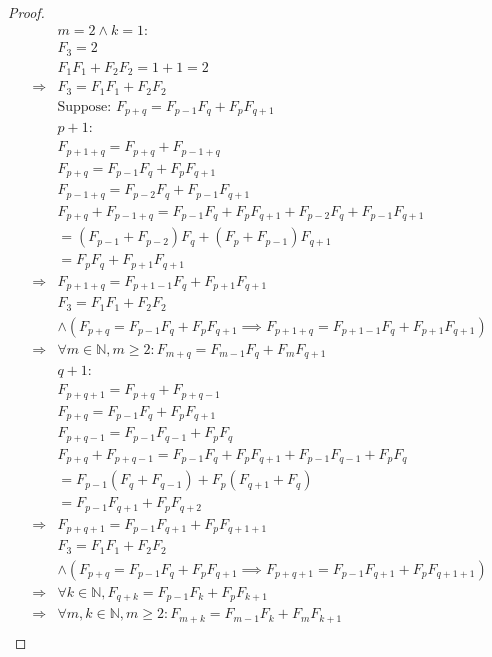 \documentclass{article}
\begin{document}
~

\begin{proof}
    \begin{align*}
        &m=2\land k=1:\\
        &F_3=2\\
        &F_{1}F_1+F_2F_{2}=1+1=2\\
        \Rightarrow&F_3=F_1F_1+F_2F_2\\
        &\text{Suppose: }F_{p+q}=F_{p-1}F_q+F_pF_{q+1}\\
        &p+1:\\
        &F_{p+1+q}=F_{p+q}+F_{p-1+q}\\
        &F_{p+q}=F_{p-1}F_q+F_pF_{q+1}\\
        &F_{p-1+q}=F_{p-2}F_{q}+F_{p-1}F_{q+1}\\
        &F_{p+q}+F_{p-1+q}=F_{p-1}F_q+F_pF_{q+1}+F_{p-2}F_{q}+F_{p-1}F_{q+1}\\
        &=(F_{p-1}+F_{p-2})F_q+(F_p+F_{p-1})F_{q+1}\\
        &=F_pF_q+F_{p+1}F_{q+1}\\
        \Rightarrow&F_{p+1+q}=F_{p+1-1}F_q+F_{p+1}F_{q+1}\\
        &F_3=F_1F_1+F_2F_2\\
        &\land (F_{p+q}=F_{p-1}F_q+F_pF_{q+1}\implies F_{p+1+q}=F_{p+1-1}F_q+F_{p+1}F_{q+1})\\
        \Rightarrow&\forall m\in\mathbb{N},m\geqslant 2 :F_{m+q}=F_{m-1}F_q+F_mF_{q+1}\\
        &q+1:\\
        &F_{p+q+1}=F_{p+q}+F_{p+q-1}\\
        &F_{p+q}=F_{p-1}F_q+F_pF_{q+1}\\
        &F_{p+q-1}=F_{p-1}F_{q-1}+F_pF_q\\
        &F_{p+q}+F_{p+q-1}=F_{p-1}F_q+F_pF_{q+1}+F_{p-1}F_{q-1}+F_pF_q\\
        &=F_{p-1}(F_q+F_{q-1})+F_p(F_{q+1}+F_q)\\
        &=F_{p-1}F_{q+1}+F_pF_{q+2}\\
        \Rightarrow&F_{p+q+1}=F_{p-1}F_{q+1}+F_pF_{q+1+1}\\
        &F_3=F_1F_1+F_2F_2\\
        &\land (F_{p+q}=F_{p-1}F_q+F_pF_{q+1}\implies F_{p+q+1}=F_{p-1}F_{q+1}+F_pF_{q+1+1})\\
        \Rightarrow&\forall k\in\mathbb{N} ,F_{q+k}=F_{p-1}F_k+F_pF_{k+1}\\
        \Rightarrow&\forall m,k\in\mathbb{N} ,m\geqslant 2:F_{m+k}=F_{m-1}F_k+F_mF_{k+1}\\
    \end{align*}
\end{proof}
\end{document}
